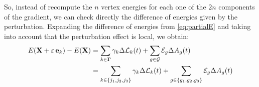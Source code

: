 
So, instead of recompute the $n$ vertex energies for each one of the $2n$ components of the gradient, we can check directly the difference of energies given by the perturbation. 
Expanding the difference of energies from \eqref{eq:partialE} and taking into account that the perturbation effect is local, we obtain:
\begin{align*}
    E(\X+\varepsilon\,  \ei{k}) - E(\X) &=  
    \sum_{k \in \boundaries}\gamma_{k}\Delta{\AL}_{k}(t) + 
     \sum_{g \in \mathcal{G}} \SE_{g}\Delta{A}_{g}(t)\\
     &=\sum_{k \in \{j_1,j_2,j_3\}}\gamma_{k}\Delta{\AL}_{k}(t)
     +\sum_{g \in \{g_1,g_2,g_3\}} \SE_{g}\Delta{A}_{g}(t)
\end{align*}
